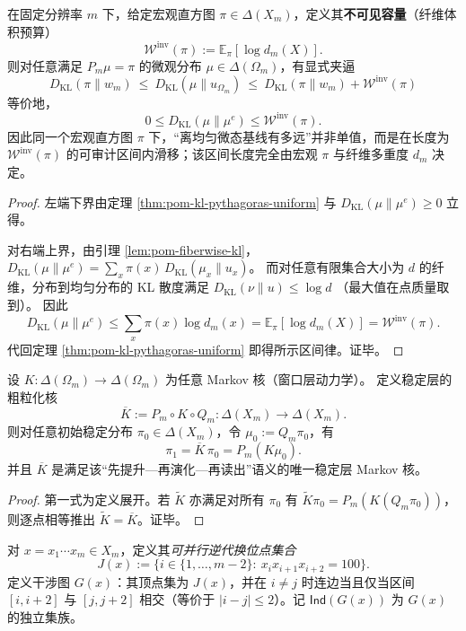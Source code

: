 \begin{corollary}\label{cor:pom-micro-slip-window}
在固定分辨率 $m$ 下，给定宏观直方图 $\pi\in\Delta(X_m)$，定义其\textbf{不可见容量}（纤维体积预算）
\[
\mathcal{W}^{\mathrm{inv}}(\pi):=\mathbb{E}_\pi[\log d_m(X)].
\]
则对任意满足 $P_m\mu=\pi$ 的微观分布 $\mu\in\Delta(\Omega_m)$，有显式夹逼
\[
\boxed{\;
D_{\mathrm{KL}}(\pi\|w_m)\ \le\ D_{\mathrm{KL}}(\mu\|u_{\Omega_m})\ \le\ D_{\mathrm{KL}}(\pi\|w_m)+\mathcal{W}^{\mathrm{inv}}(\pi)
\;}
\]
等价地，
\[
0\le D_{\mathrm{KL}}(\mu\|\mu^e)\le \mathcal{W}^{\mathrm{inv}}(\pi).
\]
因此同一个宏观直方图 $\pi$ 下，“离均匀微态基线有多远”并非单值，而是在长度为 $\mathcal{W}^{\mathrm{inv}}(\pi)$ 的可审计区间内滑移；该区间长度完全由宏观 $\pi$ 与纤维多重度 $d_m$ 决定。
\end{corollary}
\begin{proof}
左端下界由定理 \ref{thm:pom-kl-pythagoras-uniform} 与 $D_{\mathrm{KL}}(\mu\|\mu^e)\ge 0$ 立得。
\par
对右端上界，由引理 \ref{lem:pom-fiberwise-kl}，
\(
D_{\mathrm{KL}}(\mu\|\mu^e)=\sum_x \pi(x)\,D_{\mathrm{KL}}(\mu_x\|u_x)
\)。
而对任意有限集合大小为 $d$ 的纤维，分布到均匀分布的 KL 散度满足
\(
D_{\mathrm{KL}}(\nu\|u)\le \log d
\)
（最大值在点质量取到）。
因此
\[
D_{\mathrm{KL}}(\mu\|\mu^e)\le \sum_x \pi(x)\log d_m(x)=\mathbb{E}_\pi[\log d_m(X)]=\mathcal{W}^{\mathrm{inv}}(\pi).
\]
代回定理 \ref{thm:pom-kl-pythagoras-uniform} 即得所示区间律。证毕。
\end{proof}

\begin{theorem}\label{thm:pom-coarse-grained-kernel}
设 $K:\Delta(\Omega_m)\to\Delta(\Omega_m)$ 为任意 Markov 核（窗口层动力学）。
定义稳定层的粗粒化核
\[
\overline K:=P_m\circ K\circ Q_m:\Delta(X_m)\to\Delta(X_m).
\]
则对任意初始稳定分布 $\pi_0\in\Delta(X_m)$，令 $\mu_0:=Q_m\pi_0$，有
\[
\pi_1=\overline K\,\pi_0=P_m(K\mu_0).
\]
并且 $\overline K$ 是满足该“先提升—再演化—再读出”语义的唯一稳定层 Markov 核。
\end{theorem}
\begin{proof}
第一式为定义展开。若 $\widetilde K$ 亦满足对所有 $\pi_0$ 有
\(
\widetilde K\pi_0=P_m(K(Q_m\pi_0))
\)，
则逐点相等推出 $\widetilde K=\overline K$。证毕。
\end{proof}

\begin{definition}[可并行逆代换位点与干涉图]\label{def:pom-carry-interference-graph}
对 $x=x_1\cdots x_m\in X_m$，定义其\emph{可并行逆代换位点集合}
\[
J(x):=\{i\in\{1,\dots,m-2\}:\ x_ix_{i+1}x_{i+2}=100\}.
\]
定义干涉图 $G(x)$：其顶点集为 $J(x)$，并在 $i\neq j$ 时连边当且仅当区间 $[i,i+2]$ 与 $[j,j+2]$ 相交（等价于 $|i-j|\le 2$）。记 $\mathsf{Ind}(G(x))$ 为 $G(x)$ 的独立集族。
\end{definition}

